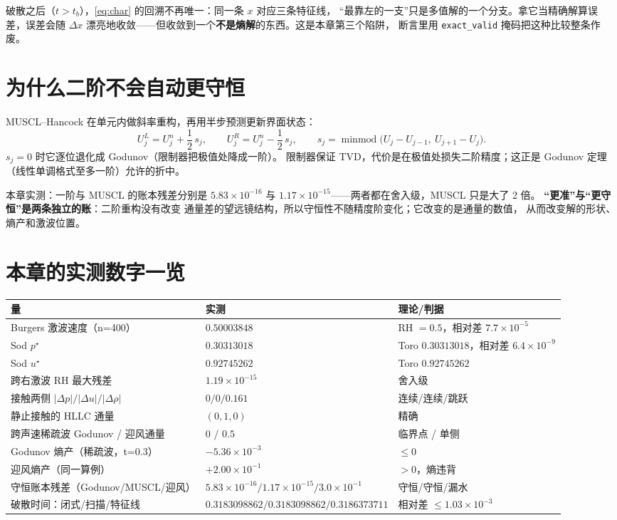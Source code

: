 破散之后（$t>t_b$），\eqref{eq:char} 的回溯不再唯一：同一条 $x$ 对应三条特征线，
``最靠左的一支''只是多值解的一个分支。拿它当精确解算误差，误差会随 $\Delta x$
漂亮地收敛——但收敛到一个\textbf{不是熵解}的东西。这是本章第三个陷阱，
断言里用 \texttt{exact\_valid} 掩码把这种比较整条作废。

\section{为什么二阶不会自动更守恒}

MUSCL--Hancock 在单元内做斜率重构，再用半步预测更新界面状态：
\begin{equation}
  U_j^{L}=U_j^n+\frac12\,s_j,\qquad
  U_j^{R}=U_j^n-\frac12\,s_j,\qquad
  s_j=\operatorname{minmod}\bigl(U_j-U_{j-1},\ U_{j+1}-U_j\bigr).
  \label{eq:muscl}
\end{equation}
$s_j=0$ 时它逐位退化成 Godunov（限制器把极值处降成一阶）。
限制器保证 TVD，代价是在极值处损失二阶精度；这正是 Godunov 定理
（线性单调格式至多一阶）允许的折中。

本章实测：一阶与 MUSCL 的账本残差分别是 $5.83\times10^{-16}$ 与
$1.17\times10^{-15}$——两者都在舍入级，MUSCL 只是大了 2 倍。
\textbf{``更准''与``更守恒''是两条独立的账}：二阶重构没有改变
通量差的望远镜结构，所以守恒性不随精度阶变化；它改变的是通量的数值，
从而改变解的形状、熵产和激波位置。

\section{本章的实测数字一览}

\begin{center}
\begin{tabular}{@{}lll@{}}
\toprule
量 & 实测 & 理论/判据 \\
\midrule
Burgers 激波速度（n=400） & $0.50003848$ & RH $=0.5$，相对差 $7.7\times10^{-5}$ \\
Sod $p^\star$ & $0.30313018$ & Toro $0.30313018$，相对差 $6.4\times10^{-9}$ \\
Sod $u^\star$ & $0.92745262$ & Toro $0.92745262$ \\
跨右激波 RH 最大残差 & $1.19\times10^{-15}$ & 舍入级 \\
接触两侧 $|\Delta p|/|\Delta u|/|\Delta\rho|$ & $0/0/0.161$ & 连续/连续/跳跃 \\
静止接触的 HLLC 通量 & $(0,1,0)$ & 精确 \\
跨声速稀疏波 Godunov / 迎风通量 & $0$ / $0.5$ & 临界点 / 单侧 \\
Godunov 熵产（稀疏波，t=0.3） & $-5.36\times10^{-3}$ & $\le0$ \\
迎风熵产（同一算例） & $+2.00\times10^{-1}$ & $>0$，熵违背 \\
守恒账本残差（Godunov/MUSCL/迎风） & $5.83\times10^{-16}/1.17\times10^{-15}/3.0\times10^{-1}$ & 守恒/守恒/漏水 \\
破散时间：闭式/扫描/特征线 & $0.3183098862/0.3183098862/0.3186373711$ & 相对差 $\le1.03\times10^{-3}$ \\
\bottomrule
\end{tabular}
\end{center}

